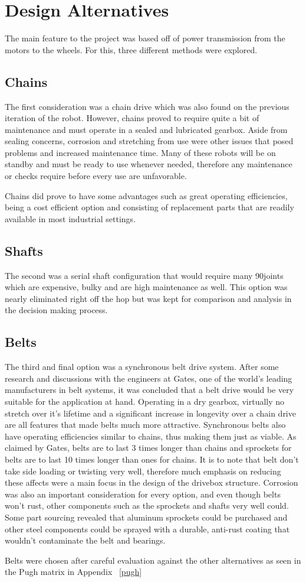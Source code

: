 \section {Design Alternatives}
The main feature to the project was based off of power transmission from the motors to the wheels. For this, three different methods were explored. 

\subsection{Chains}
The first consideration was a chain drive which was also found on the previous iteration of the robot. However, chains proved to require quite a bit of maintenance and must operate in a sealed and lubricated gearbox. Aside from sealing concerns, corrosion and stretching from use were other issues that posed problems and increased maintenance time. Many of these robots will be on standby and must be ready to use whenever needed, therefore any maintenance or checks require before every use are unfavorable. 

Chains did prove to have some advantages such as great operating efficiencies, being a cost efficient option and consisting of replacement parts that are readily available in most industrial settings.

\subsection{Shafts}
The second was a serial shaft configuration that would require many 90\degree joints which are expensive, bulky and are high maintenance as well. This option was nearly eliminated right off the hop but was kept for comparison and analysis in the decision making process. 

\subsection{Belts}
The third and final option was a synchronous belt drive system. After some research and discussions with the engineers at Gates, one of the world's leading manufacturers in belt systems, it was concluded that a belt drive would be very suitable for the application at hand. Operating in a dry gearbox, virtually no stretch over it's lifetime and a significant increase in longevity over a chain drive are all features that made belts much more attractive. Synchronous belts also have operating efficiencies similar to chains, thus making them just as viable. As claimed by Gates, belts are to last 3 times longer than chains and sprockets for belts are to last 10 times longer than ones for chains. It is to note that belt don't take side loading or twisting very well, therefore much emphasis on reducing these affects were a main focus in the design of the drivebox structure. Corrosion was also an important consideration for every option, and even though belts won't rust, other components such as the sprockets and shafts very well could. Some part sourcing revealed that aluminum sprockets could be purchased and other steel components could be sprayed with a durable, anti-rust coating that wouldn't contaminate the belt and bearings.

Belts were chosen after careful evaluation against the other alternatives as seen in the Pugh matrix in Appendix ~\ref{pugh}





